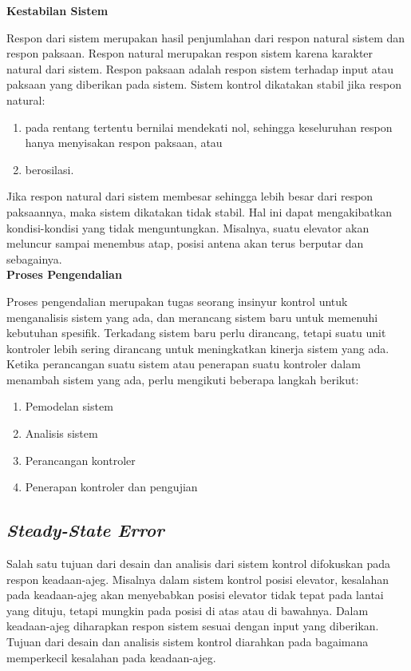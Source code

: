 \noindent \textbf{Kestabilan Sistem}

Respon dari sistem merupakan hasil penjumlahan dari respon natural sistem dan respon paksaan. Respon natural merupakan respon sistem karena karakter natural dari sistem. Respon paksaan adalah respon sistem terhadap input atau paksaan yang diberikan pada sistem.
Sistem kontrol dikatakan stabil jika respon natural:
\begin{enumerate}
	\item pada rentang tertentu bernilai mendekati nol, sehingga keseluruhan respon hanya menyisakan respon paksaan, atau
	\item berosilasi.
\end{enumerate}

Jika respon natural dari sistem membesar sehingga lebih besar dari respon paksaannya, maka sistem dikatakan tidak stabil. Hal ini dapat mengakibatkan kondisi-kondisi yang tidak menguntungkan. Misalnya, suatu elevator akan meluncur sampai menembus atap, posisi antena akan terus berputar dan sebagainya.\\

\noindent\textbf{Proses Pengendalian}

Proses pengendalian merupakan tugas seorang insinyur kontrol untuk menganalisis sistem yang ada, dan merancang sistem baru untuk memenuhi kebutuhan spesifik. Terkadang sistem baru perlu dirancang, tetapi suatu unit kontroler lebih sering dirancang untuk meningkatkan kinerja sistem yang ada. Ketika perancangan suatu sistem atau penerapan suatu kontroler dalam menambah sistem yang ada, perlu mengikuti beberapa langkah berikut: \cite{ControlSystemBook}
\begin{enumerate}
	\item Pemodelan sistem
	\item Analisis sistem
	\item Perancangan kontroler
	\item Penerapan kontroler dan pengujian
\end{enumerate}

\subsection{\textit{Steady-State Error}}

Salah satu tujuan dari desain dan analisis dari sistem kontrol difokuskan pada respon keadaan-ajeg. Misalnya dalam sistem kontrol posisi elevator, kesalahan pada keadaan-ajeg akan menyebabkan posisi elevator tidak tepat pada lantai yang dituju, tetapi mungkin pada posisi di atas atau di bawahnya. Dalam keadaan-ajeg diharapkan respon sistem sesuai dengan input yang diberikan. Tujuan dari desain dan analisis sistem kontrol diarahkan pada bagaimana memperkecil kesalahan pada keadaan-ajeg.

